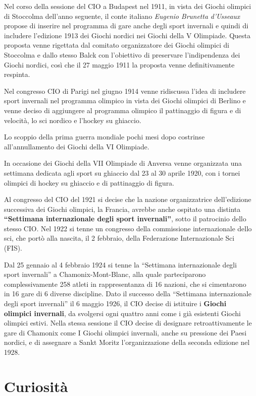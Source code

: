 \documentclass[
]{book}
\begin{document}
Nel corso della sessione del CIO a Budapest nel 1911, in vista dei Giochi olimpici di Stoccolma dell'anno seguente, il conte italiano \emph{Eugenio Brunetta d'Usseaux} propose di inserire nel programma di gare anche degli sport invernali e quindi di includere l'edizione 1913 dei Giochi nordici nei Giochi della V Olimpiade. Questa proposta venne rigettata dal comitato organizzatore dei Giochi olimpici di Stoccolma e dallo stesso Balck con l'obiettivo di preservare l'indipendenza dei Giochi nordici, così che il 27 maggio 1911 la proposta venne definitivamente respinta.

Nel congresso CIO di Parigi nel giugno 1914 venne ridiscussa l'idea di includere sport invernali nel programma olimpico in vista dei Giochi olimpici di Berlino e venne deciso di aggiungere al programma olimpico il pattinaggio di figura e di velocità, lo sci nordico e l'hockey su ghiaccio.

Lo scoppio della prima guerra mondiale pochi mesi dopo costrinse all'annullamento dei Giochi della VI Olimpiade.

In occasione dei Giochi della VII Olimpiade di Anversa venne organizzata una settimana dedicata agli sport su ghiaccio dal 23 al 30 aprile 1920, con i tornei olimpici di hockey su ghiaccio e di pattinaggio di figura.

Al congresso del CIO del 1921 si decise che la nazione organizzatrice dell'edizione successiva dei Giochi olimpici, la Francia, avrebbe anche ospitato una distinta \textbf{``Settimana internazionale degli sport invernali''}, sotto il patrocinio dello stesso CIO.
Nel 1922 si tenne un congresso della commissione internazionale dello sci, che portò alla nascita, il 2 febbraio, della Federazione Internazionale Sci (FIS).

Dal 25 gennaio al 4 febbraio 1924 si tenne la ``Settimana internazionale degli sport invernali'' a Chamonix-Mont-Blanc, alla quale parteciparono complessivamente 258 atleti in rappresentanza di 16 nazioni, che si cimentarono in 16 gare di 6 diverse discipline.
Dato il successo della ``Settimana internazionale degli sport invernali'' il 6 maggio 1926, il CIO decise di istituire i \textbf{Giochi olimpici invernali}, da svolgersi ogni quattro anni come i già esistenti Giochi olimpici estivi.
Nella stessa sessione il CIO decise di designare retroattivamente le gare di Chamonix come I Giochi olimpici invernali, anche su pressione dei Paesi nordici, e di assegnare a Sankt Moritz l'organizzazione della seconda edizione nel 1928.

\section*{Curiosità}\label{curiosituxe0}
\end{document}

